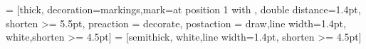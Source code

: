 %      
%
%
\def\linea{\vskip\baselineskip      %
           \hrule                   %
           \vskip\baselineskip}     %
 \def\nsfline{\hrule
 }
 \def\nsfitem#1{
  \begin{center}
  {\bf\LARGE\cool{#1}}\\*[7mm]
  \end{center}\hrule
 }
 \def\sqbullet{\vrule height .9ex width .8ex depth -.1ex }        %
%
%
 \newcommand{\caja}[1]{\vbox{\hrule height1.6pt\hbox{\vrule
width1.6pt\kern3pt \vbox{\kern3pt{\vbox{\strut#1\strut}}\kern3pt}\kern3pt\vrule width1.6pt}\hrule
height1.6pt}}

 \newcommand{\cajas}[3]{\vbox{\hrule height#1\hbox{\vrule
width#1\kern#2\vbox{\kern#2{\vbox{\strut#3\strut}}\kern#2}\kern#2\vrule width#1}\hrule
height#1}}

 = [thick, decoration={markings,mark=at position
   1 with {}},
   double distance=1.4pt, shorten >= 5.5pt,
   preaction = {decorate},
   postaction = {draw,line width=1.4pt, white,shorten >= 4.5pt}]
 = [semithick, white,line width=1.4pt, shorten >= 4.5pt]
